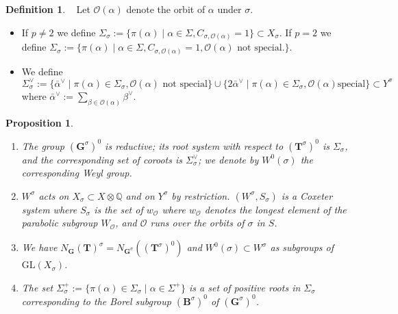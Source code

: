 \documentclass{amsart}
\newtheorem{proposition}[equation]{Proposition}
\numberwithin{equation}{section}
\theoremstyle{definition}
\newtheorem{definition}[equation]{Definition}
\theoremstyle{remark}
\newcommand\bB{{\mathbf B}}
\newcommand\bG{{\mathbf G}}
\newcommand\bT{{\mathbf T}}
\newcommand\BQ{{\mathbb Q}}
\newcommand\CO{{\mathcal O}}
\newcommand\Gs{{\bG^\sigma}}
\newcommand\Gso{{(\Gs)^0}}
\newcommand\Tso{{(\bT^\sigma)^0}}
\newcommand\GL{\mathrm{GL}}
\begin{document}
\begin{definition}\label{Sigmatsigma}~
\index{O(alpha)@$\CO(\alpha)$}
Let $\CO(\alpha)$ denote the orbit of $\alpha$ under $\sigma$.
\begin{itemize}
\item
If $p\ne 2$ we define
$\Sigma_\sigma:=\{\pi(\alpha)\mid\alpha\in\Sigma, C_{\sigma,\CO(\alpha)}=1\}
\subset X_\sigma$. If $p=2$ we define
$\Sigma_\sigma:=\{\pi(\alpha)\mid\alpha\in\Sigma, C_{\sigma,\CO(\alpha)}=1,
\text{$\CO(\alpha)$ not special}.\}$.
\item
We define
$\Sigma_\sigma^\vee:=
\{\bar\alpha^\vee\mid \pi(\alpha)\in\Sigma_\sigma, \CO(\alpha)\text{ not
special}\}\cup
\{2\bar\alpha^\vee\mid \pi(\alpha)\in\Sigma_\sigma, \CO(\alpha)\text{
special}\} \subset Y^\sigma$
where $\bar\alpha^\vee:=\sum_{\beta\in\CO(\alpha)}\beta^\vee$.
\end{itemize}
\end{definition}
\begin{proposition}\label{root system of Gtso}~
\begin{enumerate}
\item
The  group $\Gso$ is reductive;  its root system with  respect to $\Tso$ is
$\Sigma_\sigma$, and the corresponding set of coroots is
$\Sigma_\sigma^\vee$; we denote by $W^0(\sigma)$ the corresponding Weyl group.
\item
$W^\sigma$ acts on
$X_\sigma\subset X\otimes\BQ$ and on $Y^\sigma$ by restriction.
$(W^\sigma,S_\sigma)$ is a Coxeter system where 
$S_\sigma$ is the set of $w_\CO$ where $w_\CO$ denotes the longest
element of the parabolic subgroup $W_\CO$, and $\CO$ runs over the orbits of
$\sigma$ in $S$.
\item
{}
We have $N_\bG(\bT)^\sigma=N_\Gs(\Tso)$ and
$W^0(\sigma)\subset W^\sigma$ as subgroups of $\GL(X_\sigma)$.
\item
The set
$\Sigma_\sigma^+:=\{\pi(\alpha)\in\Sigma_\sigma\mid \alpha \in\Sigma^+\}$ 
is a set of positive roots in $\Sigma_\sigma$ corresponding to the Borel
subgroup $(\bB^\sigma)^0$ of $\Gso$.
\end{enumerate}
\end{proposition}
\end{document}
